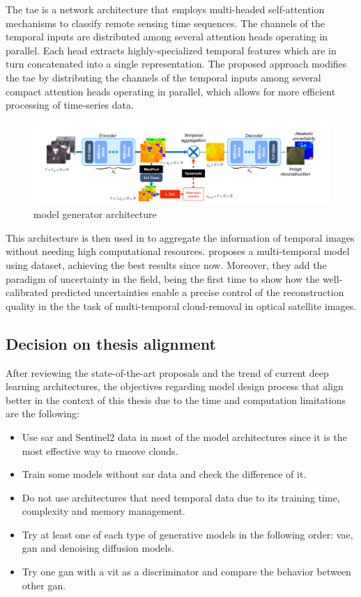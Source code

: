 \documentclass[11pt, a4paper]{article}
\begin{document}
	The  \gls{tae} is a network architecture that employs multi-headed self-attention mechanisms to classify remote sensing time sequences. The channels of the temporal inputs are distributed among several attention heads operating in parallel. Each head extracts highly-specialized temporal features which are in turn concatenated into a single representation. The proposed approach modifies the \gls{tae} by distributing the channels of the temporal inputs among several compact attention heads operating in parallel, which allows for more efficient processing of time-series data. 
	\begin{figure}[H]
		\centering
		\includegraphics[width=15cm]{imgs/relatedwork/uncertainty}
		\caption{\cite{uncrtaints2021ebel} model generator architecture}
	\end{figure}
	This architecture is then used in \cite{uncrtaints2021ebel} to aggregate the information of temporal images without needing high computational resources. \cite{uncrtaints2021ebel} proposes a multi-temporal model using \cite{sen12mscrts} dataset, achieving the best results since now. Moreover, they add the paradigm of uncertainty in the field, being the first time to show how the well-calibrated predicted uncertainties
	enable a precise control of the reconstruction quality in the the task of multi-temporal
	cloud-removal in optical satellite images.

	\subsection{Decision on thesis alignment}
	After reviewing the state-of-the-art proposals and the trend of current deep learning architectures, the objectives regarding model design process that align better in the context of this thesis due to the time and computation limitations are the following:
	\begin{itemize}
		\item Use \gls{sar} and Sentinel2 data in most of the model architectures since it is the most effective way to rmeove clouds.
		\item Train some models without \gls{sar} data and check the difference of it.
		\item Do not use architectures that need temporal data due to its training time, complexity and memory management.
		\item Try at least one of each type of generative models in the following order: \gls{vae}, \gls{gan} and denoising diffusion models.
		\item Try one \gls{gan} with a \gls{vit} as a discriminator and compare the behavior between other \gls{gan}.
	\end{itemize}
\end{document}

